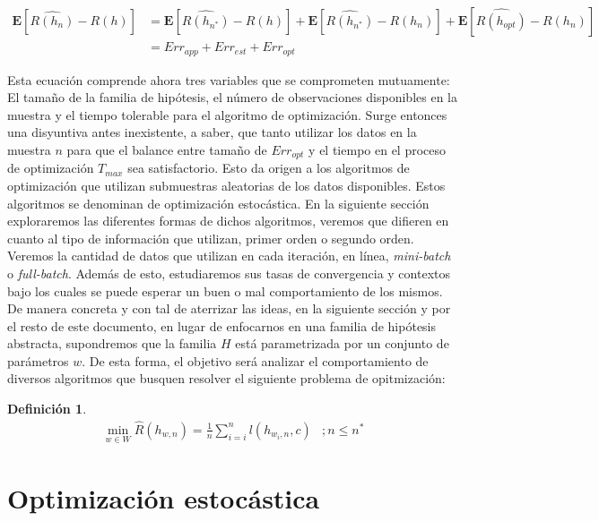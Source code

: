 \documentclass{book}
\theoremstyle{plain}
\theoremstyle{definition}
\newtheorem{defn}{Definición}[section]
\theoremstyle{remark}
\begin{document}
\begin{equation*}
  \begin{split}
    \mathbf{E}[\hat{R(h_{n})} - R(h)] & = \mathbf{E}[\hat{R(h_{n^{*}})} - R(h)] + \mathbf{E}[\hat{R(h_{n^{*}})} - R(h_n)] +  \mathbf{E}[\hat{R(h_{opt})} - R(h_n)]\\
                                     & = Err_{app} + Err_{est} + Err_{opt}
  \end{split}
\end{equation*}

Esta ecuación comprende ahora tres variables que se comprometen mutuamente: El tamaño de la familia de hipótesis, el número de observaciones disponibles en la muestra y el tiempo tolerable para el algoritmo de optimización. Surge entonces una disyuntiva antes inexistente, a saber, que tanto utilizar los datos en la muestra $n$ para que el balance entre tamaño de $Err_{opt}$ y el tiempo en el proceso de optimización $T_{max}$ sea satisfactorio. Esto da origen a los algoritmos de optimización que utilizan submuestras aleatorias de los datos disponibles. Estos algoritmos se denominan de optimización estocástica. En la siguiente sección exploraremos las diferentes formas de dichos algoritmos, veremos que difieren en cuanto al tipo de información que utilizan, primer orden o segundo orden. Veremos la cantidad de datos que utilizan en cada iteración, en línea, \emph{mini-batch} o \emph{full-batch}. Además de esto, estudiaremos sus tasas de convergencia y contextos bajo los cuales se puede esperar un buen o mal comportamiento de los mismos. De manera concreta y con tal de aterrizar las ideas, en la siguiente sección y por el resto de este documento, en lugar de enfocarnos en una familia de hipótesis abstracta, supondremos que la familia $H$ está parametrizada por un conjunto de parámetros $w$. De esta forma, el objetivo será analizar el comportamiento de diversos algoritmos que busquen resolver el siguiente problema de opitmización:

\begin{defn}\label{eq:central_prob}
\begin{equation*}
\begin{split}
\displaystyle\min_{w\in W}\hat{R}(h_{w,n})=\frac{1}{n}\displaystyle\sum_{i=i}^n l(h_{w_i,n},c) &; n\leq n^{*}
\end{split}
\end{equation*}

\end{defn}

\chapter{Optimización estocástica}
\end{document}
